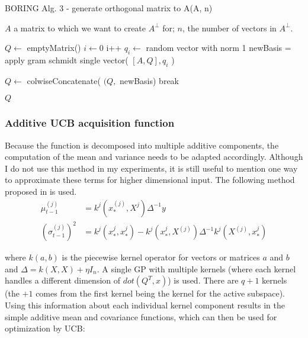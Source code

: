 \begin{algorithm}[H]
\caption{BORING Alg. 3 - generate orthogonal matrix to A(A, n) }

\begin{algorithmic} 
\REQUIRE $A$ a matrix to which we want to create $A^{\bot}$ for; $n$, the number of vectors in $A^{\bot}$.

\STATE $Q \leftarrow$ emptyMatrix()
\STATE $i \leftarrow 0$ 
\STATE i++
\STATE $q_i \leftarrow $ random vector with norm 1
\STATE newBasis = apply gram schmidt single vector( $[A, Q], q_i$ ) 

\STATE $Q \leftarrow$ colwiseConcatenate( $(Q, $ newBasis)
\STATE break
\ENDIF
\ENDWHILE                
\ENDFOR

\RETURN $Q$
\end{algorithmic}
\end{algorithm}

\subsubsection{Additive UCB acquisition function}

Because the function is decomposed into multiple additive components, the computation of the mean and variance needs to be adapted accordingly. 
Although I do not use this method in my experiments, it is still useful to mention one way to approximate these terms for higher dimensional input.
The following method proposed in \citep{Rolland}  is used. \\

\begin{align}
\mu_{t-1}^{(j)} &= k^j(x_*^{(j)}, X^j)\Delta^{-1}y \\
\left( \sigma_{t-1}^{(j)} \right)^2 &= k^j(x_*^{j}, x_*^{j}) - k^j(x_*^j, X^{(j)}) \Delta^{-1} k^j(X^{(j)}, x_*^j)
\end{align}

where $k(a, b)$ is the piecewise kernel operator for vectors or matrices $a$ and $b$ and $\Delta = k(X, X) + \eta I_n$.
A single GP with multiple kernels (where each kernel handles a different dimension of $dot(Q^T, x)$) is used.
There are $q+1$ kernels (the $+1$ comes from the first kernel being the kernel for the active subspace). \\

Using this information about each individual kernel component results in the simple additive mean and covariance functions, which can then be used for optimization by UCB:

